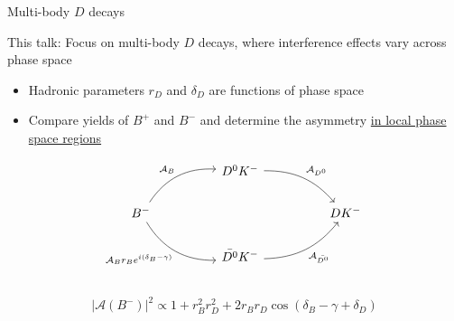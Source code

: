 \documentclass[xcolor={dvipsnames}]{beamer}
\begin{document}
\begin{frame}[fragile]{Multi-body $D$ decays}
  \begin{center}
    This talk: Focus on multi-body $D$ decays, where interference effects vary across phase space
  \end{center}
  \begin{itemize}
    \setlength\itemsep{0.5em}
    \item{Hadronic parameters $r_D$ and $\delta_D$ are functions of phase space}
    \item{Compare yields of $B^+$ and $B^-$ and determine the asymmetry \underline{in local phase space regions}}
  \end{itemize}
  \begin{equation*}
    \begin{tikzcd}[column sep=huge]
      & D^0K^- \arrow[dr, bend left = 25, "\mathcal{A}_{D^0}"] & \\
      B^- \arrow[ur, bend left, "\mathcal{A}_B"] \arrow[dr, bend right, "\mathcal{A}_B r_B e^{i(\delta_B - \gamma)}"'] & [5cm] & DK^- \\
      & \bar{D^0}K^- \arrow[ur, bend right = 25, "\mathcal{A}_{\bar{D^0}}"'] & \\
    \end{tikzcd}
  \end{equation*}
  \vspace{-0.7cm}
  \begin{equation*}
    \lvert\mathcal{A}(B^-)\lvert^2\propto1 + r_B^2r_D^2 + 2r_Br_D\cos(\delta_B - \gamma + \delta_D)
  \end{equation*}
\end{frame}
\end{document}
